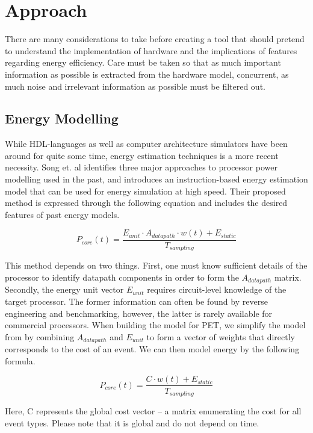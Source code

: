 \section{Approach}

There are many considerations to take before creating a tool that should pretend
to understand the implementation of hardware and the implications of features
regarding energy efficiency. Care must be taken so that as much important
information as possible is extracted from the hardware model, concurrent, as
much noise and irrelevant information as possible must be filtered out.

\subsection{Energy Modelling}

While HDL-languages as well as computer architecture simulators have been around
for quite some time, energy estimation techniques is a more recent necessity.
Song et. al \cite{song2012instruction} identifies three major approaches to
processor power modelling used in the past, and introduces an instruction-based
energy estimation model that can be used for energy simulation at high speed.
Their proposed method is expressed through the following equation and includes
the desired features of past energy models.

\[
    P_{core}(t) = \frac{E_{unit} \cdot A_{datapath} \cdot w(t) +
    E_{static}}{T_{sampling}}
\]

This method depends on two things. First, one must know sufficient details of
the processor to identify datapath components in order to form the
$A_{datapath}$ matrix. Secondly, the energy unit vector $E_{unit}$ requires
circuit-level knowledge of the target processor. The former information can
often be found by reverse engineering and benchmarking, however, the latter is
rarely available for commercial processors. When building the model for PET, we
simplify the model from \cite{song2012instruction} by combining $A_{datapath}$
and $E_{unit}$ to form a vector of weights that directly corresponds to the cost
of an event. We can then model energy by the following formula.

\[
    P_{core}(t) = \frac{C \cdot w(t) + E_{static}}{T_{sampling}}
\]

Here, C represents the global cost vector -- a matrix enumerating the cost
for all event types. Please note that it is global and do not depend on time.

